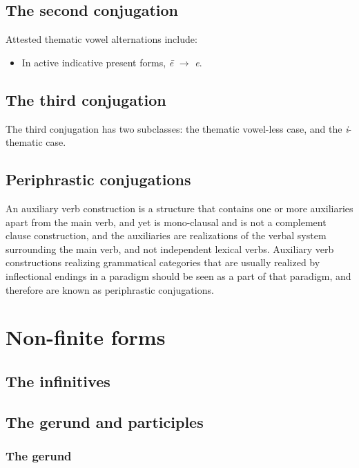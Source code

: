 \documentclass[a4paper, oneside]{report}
\newcommand{\form}[1]{\emph{#1}}
\begin{document}
\subsection{The second conjugation}\label{sec:verb-morphology.2c}

Attested thematic vowel alternations include:
\begin{itemize}
    \item In active indicative present forms, \form{\={e}} $\to$ \form{e}.
\end{itemize}

\subsection{The third conjugation}

The third conjugation has two subclasses:
the thematic vowel-less case, 
and the \form{i}-thematic case.

\subsection{Periphrastic conjugations}

An auxiliary verb construction is a structure 
that contains one or more auxiliaries apart from the main verb, 
and yet is mono-clausal and is not a complement clause construction,
and the auxiliaries are realizations of the verbal system 
surrounding the main verb, and not independent lexical verbs.
Auxiliary verb constructions realizing grammatical categories 
that are usually realized by inflectional endings in a paradigm
should be seen as a part of that paradigm,
and therefore are known as periphrastic conjugations.

\section{Non-finite forms}

\subsection{The infinitives}\label{sec:infinitives}

\subsection{The gerund and participles}\label{sec:nominal-form}

\subsubsection{The gerund}\label{sec:gerund-morphology}
\end{document}
